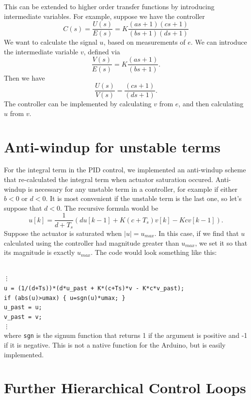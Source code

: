 This can be extended to higher order transfer functions by introducing intermediate variables. For example, suppose we have the controller
\[
C(s) = \frac{U(s)}{E(s)} = K\frac{(as+1)(cs+1)}{(bs+1)(ds+1)}
\]
We want to calculate the signal $u$, based on measurements of $e$. We can introduce the intermediate variable $v$, defined via 
\[
\frac{V(s)}{E(s)} = K\frac{(as+1)}{(bs+1)}.
\]
Then we have
\[
\frac{U(s)}{V(s)} = \frac{(cs+1)}{(ds+1)}.
\]
The controller can be implemented by calculating $v$ from $e$, and then calculating $u$ from $v$.

\section{Anti-windup for unstable terms}

For the integral term in the PID control, we implemented an anti-windup scheme that re-calculated the integral term when actuator saturation occured. Anti-windup is necessary for any unstable term in a controller, for example if either $b<0$ or $d<0$. It is most convenient if the unstable term is the last one, so let's suppose that $d<0$. The recursive formula would be
\[
u[k] = \frac{1}{d+T_{s}}\left(d u[k-1]  + K(c+T_{s})v[k] - Kcv[k-1]\right).
\]
Suppose the actuator is saturated when $|u| = u_{max}$. In this case, if we find that $u$ calculated using the controller had magnitude greater than $u_{max}$, we set it so that its magnitude is exactly $u_{max}$. The code would look something like this:

\texttt{\\
\vdots\\
u = (1/(d+Ts))*(d*u\_past + K*(c+Ts)*v - K*c*v\_past); \\
if (abs(u)>umax) \{ u=sgn(u)*umax; \}\\
u\_past = u;\\
v\_past = v;\\
\vdots\\
}
where \texttt{sgn} is the signum function that returns 1 if the argument is positive and -1 if it is negative. This is not a native function for the Arduino, but is easily implemented.

\section{Further Hierarchical Control Loops}

